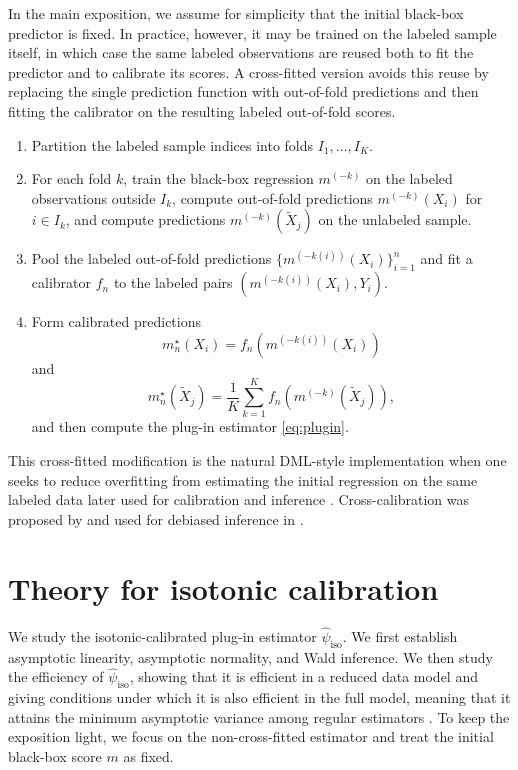 \documentclass{article}
\theoremstyle{plain}
\theoremstyle{definition}
\newcommand{\1}{\mathbbm{1}}
\newcommand{\mhat}{m}
\newcommand{\fhat}{f_n}
\newcommand{\mtilde}{m_n^\star}
\begin{document}
In the main exposition, we assume for simplicity that the initial black-box predictor is fixed. In practice, however, it may be trained on the labeled sample itself, in which case the same labeled observations are reused both to fit the predictor and to calibrate its scores. A cross-fitted version avoids this reuse by replacing the single prediction function with out-of-fold predictions and then fitting the calibrator on the resulting labeled out-of-fold scores.

\begin{enumerate}[leftmargin=6mm,label=\arabic*.]
\item Partition the labeled sample indices into folds \(I_1,\dots,I_K\).
\item For each fold \(k\), train the black-box regression \(\mhat^{(-k)}\) on the labeled observations outside \(I_k\), compute out-of-fold predictions \(\mhat^{(-k)}(X_i)\) for \(i\in I_k\), and compute predictions \(\mhat^{(-k)}(\widetilde X_j)\) on the unlabeled sample.
\item Pool the labeled out-of-fold predictions \(\{\mhat^{(-k(i))}(X_i)\}_{i=1}^n\) and fit a calibrator \(\fhat\) to the labeled pairs \((\mhat^{(-k(i))}(X_i),Y_i)\).
\item Form calibrated predictions
\[
\mtilde(X_i)=\fhat(\mhat^{(-k(i))}(X_i))
\]
and
\[
\mtilde(\widetilde X_j)=\frac{1}{K}\sum_{k=1}^K \fhat(\mhat^{(-k)}(\widetilde X_j)),
\]
and then compute the plug-in estimator \cref{eq:plugin}.
\end{enumerate}

This cross-fitted modification is the natural DML-style implementation when one seeks to reduce overfitting from estimating the initial regression on the same labeled data later used for calibration and inference \citep{schick1986asymptotically,zheng2010asymptotic,DoubleML}. Cross-calibration was proposed by \citet{van2023causal} and used for debiased inference in \citet{van2024stabilized,van2024automatic,rabenseifner2025causal}.


\section{Theory for isotonic calibration}
\label{sec:theory}
We study the isotonic-calibrated plug-in estimator \(\widehat{\psi}_{\mathrm{iso}}\). We first establish asymptotic linearity, asymptotic normality, and Wald inference.  We then study the efficiency of \(\widehat{\psi}_{\mathrm{iso}}\), showing that it is efficient in a reduced data model and giving conditions under which it is also efficient in the full model, meaning that it attains the minimum asymptotic variance among regular estimators \citep{bickel1993efficient,van2000asymptotic}. To keep the exposition light, we focus on the non-cross-fitted estimator and treat the initial black-box score \(\mhat\) as fixed. 
\end{document}
